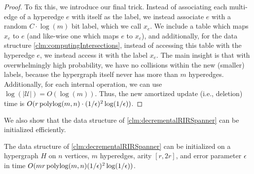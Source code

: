 \documentclass{article}
\begin{document}
\begin{proof}
    To fix this, we introduce our final trick. Instead of associating each multi-edge of a hyperedge $e$ with itself as the label, we instead associate $e$ with a random $C \cdot \log(m)$ bit label, which we call $x_e$. We include a table which maps $x_e$ to $e$ (and like-wise one which maps $e$ to $x_e$), and additionally, for the data structure \cref{clm:computingIntersections}, instead of accessing this table with the hyperedge $e$, we instead access it with the label $x_e$. The main insight is that with overwhelmingly high probability, we have no collisions within the new (smaller) labels, because the hypergraph itself never has more than $m$ hyperedges. Additionally, for each internal operation, we can use $\log(|\mathcal{U}|)= O(\log(m))$. Thus, the new amortized update (i.e., deletion) time is $O(r\operatorname{polylog}(m,n) \cdot (1 / \epsilon)^2\log(1/\epsilon) )$.
\end{proof}

We also show that the data structure of \cref{clm:decrementalRIRSpanner} can be initialized efficiently.

\begin{claim}\label{clm:decrementalLowStrengthInit}
    The data structure of \cref{clm:decrementalRIRSpanner} can be initialized on a hypergraph $H$ on $n$ vertices, $m$ hyperedges, arity $[r, 2r]$, and error parameter $\epsilon$ in time $O(m r \operatorname{polylog}(m,n) (1/\epsilon)^2 \log(1/\epsilon) )$.
\end{claim}
\end{document}
